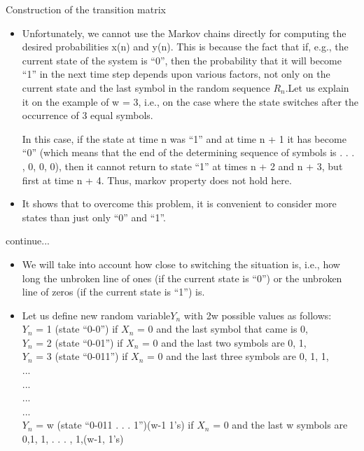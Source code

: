 \documentclass{beamer}
\begin{document}
\begin{frame}
   \begin{block}{Construction of the transition matrix}
   \begin{itemize}
   \item Unfortunately, we cannot use the Markov chains directly for computing the desired probabilities x(n) and y(n). This is because the fact that if, e.g., the current state of the system is “0”, then the probability that it will become “1” in the next time step depends upon various factors, not only on the current state and the last symbol in the random sequence \(R_n\).Let us explain it on the example of w = 3, i.e., on the case where the state switches after the occurrence of 3 equal symbols.
    \begin{example}
       In this case, if the state at time n was “1” and at time n + 1 it has
       become “0” (which means that the end of the determining sequence of symbols
       is . . . , 0, 0, 0), then it cannot return to state “1” at times n + 2 and n + 3, but
       first at time n + 4. Thus, markov property does not hold here.
    \end{example}
    \item It shows that to overcome this problem, it is convenient to consider more states than just only “0” and “1”. 
   \end{itemize}
   \end{block}
    
\end{frame}
\begin{frame}
  \begin{block}{continue...}
  \begin{itemize}
  \item We will take into account how close to switching the situation is, i.e., how long the unbroken line of ones (if the current state is “0”) or the unbroken line of zeros (if the current state is “1”) is.
  \item  Let us define new random variable\(Y_n\) with 2w possible values as follows:\\
   \(Y_n\) = 1 (state “0-0”) if \(X_n\) = 0 and the last symbol that came is 0,\\
   \(Y_n\) = 2 (state “0-01”) if \(X_n\) = 0 and the last two symbols are 0, 1, \\
   \(Y_n\) = 3 (state “0-011”) if \(X_n\) = 0 and the last three symbols are 0, 1, 1, \\
   ...\\
   ...\\
   ...\\
   ...\\
   \(Y_n\) = w (state “0-011 . . . 1”)(w-1 1's) if \(X_n\) = 0 and the last w symbols are 0,1, 1, . . . , 1,(w-1, 1's) 
  \end{itemize}
  \end{block}
    
\end{frame}
\end{document}
